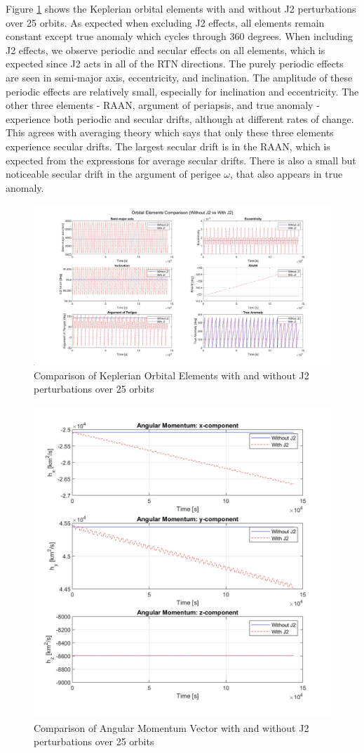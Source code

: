 Figure \ref{fig:j2_oe_comparison} shows the Keplerian orbital elements with and without J2 perturbations over 25 orbits. As expected when excluding J2 effects, all elements remain constant except true anomaly which cycles through 360 degrees. When including J2 effects, we observe periodic and secular effects on all elements, which is expected since J2 acts in all of the RTN directions. The purely periodic effects are seen in semi-major axis, eccentricity, and inclination. The amplitude of these periodic effects are relatively small, especially for inclination and eccentricity. The other three elements - RAAN, argument of periapsis, and true anomaly - experience both periodic and secular drifts, although at different rates of change. This agrees with averaging theory which says that only these three elements experience secular drifts. The largest secular drift is in the RAAN, which is expected from the expressions for average secular drifts. There is also a small but noticeable secular drift in the argument of perigee $\omega$, that also appears in true anomaly. 

\begin{figure}[H]
    \centering
    \includegraphics[width=1.1\linewidth]{PS1/Figures/OE_J2_Comparison.jpg}
    \caption{Comparison of Keplerian Orbital Elements with and without J2 perturbations over 25 orbits}
    \label{fig:j2_oe_comparison}
\end{figure}

\begin{figure}[H]
    \centering
    \includegraphics[width=0.5\linewidth]{PS1/Figures/h_J2_comparison.jpg}
    \caption{Comparison of Angular Momentum Vector with and without J2 perturbations over 25 orbits}
    \label{fig:angular_momentum}
\end{figure}

